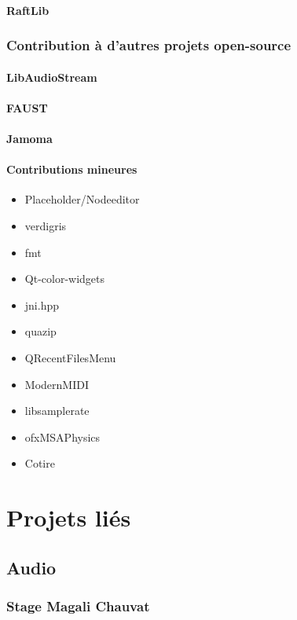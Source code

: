 \documentclass[french,a4paper]{book}
\begin{document}
\paragraph{RaftLib}

\subsubsection{Contribution à d'autres projets open-source}
\paragraph{LibAudioStream}
\paragraph{FAUST}
\paragraph{Jamoma}
\paragraph{Contributions mineures}
\begin{itemize}
\item Placeholder/Nodeeditor
\item verdigris
\item fmt
\item Qt-color-widgets
\item jni.hpp
\item quazip
\item QRecentFilesMenu
\item ModernMIDI
\item libsamplerate
\item ofxMSAPhysics
\item Cotire
\end{itemize}

\section{Projets liés}

\subsection{Audio}

\subsubsection{Stage Magali Chauvat}
\end{document}
